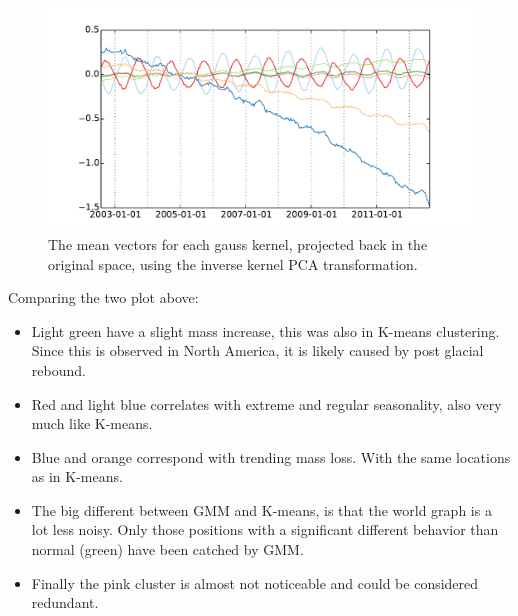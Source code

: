 \begin{figure}[H]
	\center
	\includegraphics[width=\textwidth]{figures/gmm-centroids}
	\caption{The mean vectors for each gauss kernel, projected back in the original space, using the inverse kernel PCA transformation.}
\end{figure}

Comparing the two plot above:
\begin{itemize}
	\item Light green have a slight mass increase, this was also in K-means clustering. Since this is observed in North America, it is likely caused by post glacial rebound.
	\item  Red and light blue correlates with extreme and regular seasonality, also very much like K-means.
	\item Blue and orange correspond with trending mass loss. With the same locations as in K-means.
	\item The big different between GMM and K-means, is that the world graph is a lot less noisy. Only those positions with a significant different behavior than normal (green) have been catched by GMM.
	\item Finally the pink cluster is almost not noticeable and could be considered redundant. 
\end{itemize}
